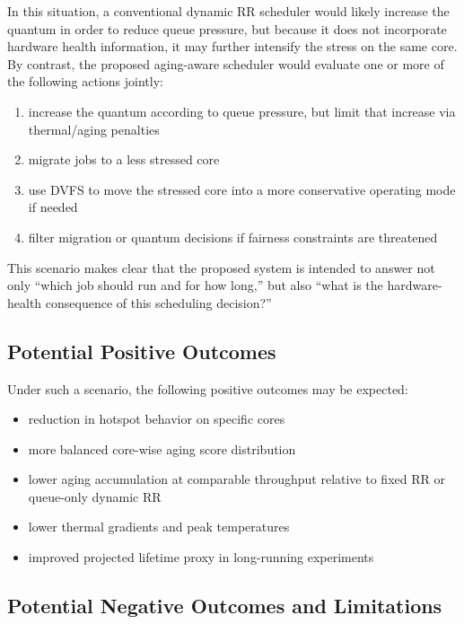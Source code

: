 \documentclass[12pt,a4paper]{article}
\begin{document}
In this situation, a conventional dynamic RR scheduler would likely increase the quantum in order to reduce queue
pressure, but because it does not incorporate hardware health information, it may further intensify the stress on the
same core. By contrast, the proposed aging-aware scheduler would evaluate one or more of the following actions jointly:

\begin{enumerate}[leftmargin=*]
\item increase the quantum according to queue pressure, but limit that increase via thermal/aging penalties
\item migrate jobs to a less stressed core
\item use DVFS to move the stressed core into a more conservative operating mode if needed
\item filter migration or quantum decisions if fairness constraints are threatened
\end{enumerate}

This scenario makes clear that the proposed system is intended to answer not only ``which job should run and for how long,''
but also ``what is the hardware-health consequence of this scheduling decision?''

\subsection{Potential Positive Outcomes}

Under such a scenario, the following positive outcomes may be expected:

\begin{itemize}[leftmargin=*]
\item reduction in hotspot behavior on specific cores
\item more balanced core-wise aging score distribution
\item lower aging accumulation at comparable throughput relative to fixed RR or queue-only dynamic RR
\item lower thermal gradients and peak temperatures
\item improved projected lifetime proxy in long-running experiments
\end{itemize}

\subsection{Potential Negative Outcomes and Limitations}
\end{document}
